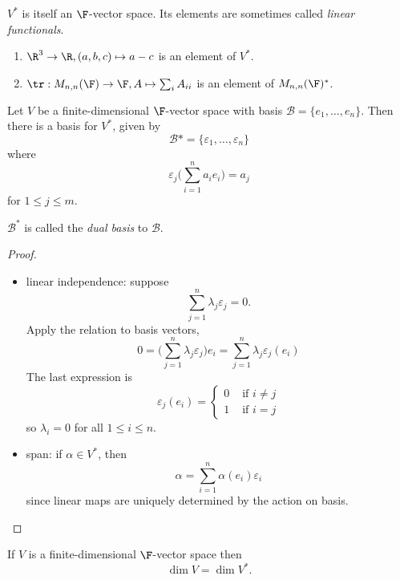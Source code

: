 \documentclass[a4paper]{article}
\newcommand*{\basis}{\mathcal}
\theoremstyle{definition}
\begin{document}
\(V^*\) is itself an \(\F\)-vector space. Its elements are sometimes called \emph{linear functionals}.

\begin{eg}\leavevmode
  \begin{enumerate}
  \item \(\R^3 \to \R, (a,b,c)\mapsto a-c\) is an element of \(V^*\).
  \item \(\tr: M_{n,n}(\F)\to \F, A\mapsto \sum_i A_{ii}\) is an element of \(M_{n,n}(\F)^*\).
  \end{enumerate}
\end{eg}

\begin{lemma}
  Let \(V\) be a finite-dimensional \(\F\)-vector space with basis \(\basis B = \{e_1,\dots,e_n\}\). Then there is a basis for \(V^*\), given by
  \[
    \basis B* = \{\varepsilon_1,\dots, \varepsilon_n\}
  \]
  where
  \[
    \varepsilon_j \Big( \sum_{i=1}^{n} a_i e_i \Big) = a_j
  \]
  for \(1\leq j\leq m\).

  \(\basis B^*\) is called the \emph{dual basis} to \(\basis B\).
\end{lemma}

\begin{proof}\leavevmode
  \begin{itemize}
  \item linear independence: suppose
    \[
      \sum_{j=1}^{n}\lambda_j\varepsilon_j = 0.
    \]
    Apply the relation to basis vectors,
    \[
      0 = \Big( \sum_{j=1}^n \lambda_j\varepsilon_j \Big) e_i = \sum_{j=1}^n \lambda_j\varepsilon_j(e_i)
      \]
      The last expression is 
      \[
        \varepsilon_j(e_i) = 
      \begin{cases}
        0 & \text{ if } i \neq j \\
        1 & \text{ if } i = j
      \end{cases}
    \]
    so \(\lambda_i=0\) for all \(1 \leq i \leq n\).
  \item span: if \(\alpha \in V^*\), then
    \[
      \alpha = \sum_{i=1}^{n}\alpha(e_i)\varepsilon_i
    \]
    since linear maps are uniquely determined by the action on basis.
  \end{itemize}
\end{proof}

\begin{corollary}
  If \(V\) is a finite-dimensional \(\F\)-vector space then
  \[
    \dim V = \dim V^*.
  \]
\end{corollary}
\end{document}
